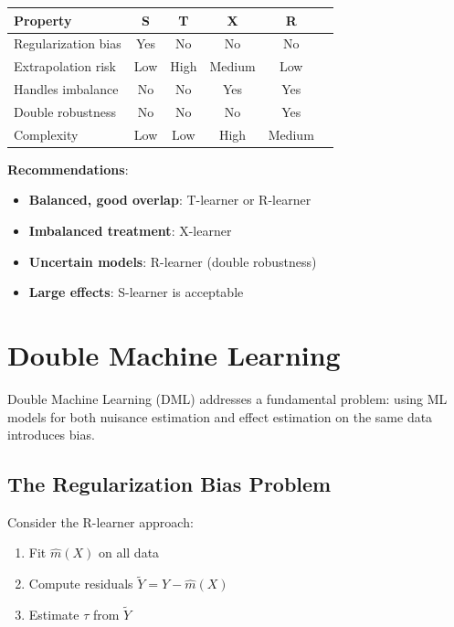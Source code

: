 \begin{center}
\begin{tabular}{lccccc}
\toprule
Property & S & T & X & R \\
\midrule
Regularization bias & Yes & No & No & No \\
Extrapolation risk & Low & High & Medium & Low \\
Handles imbalance & No & No & Yes & Yes \\
Double robustness & No & No & No & Yes \\
Complexity & Low & Low & High & Medium \\
\bottomrule
\end{tabular}
\end{center}

\textbf{Recommendations}:
\begin{itemize}
    \item \textbf{Balanced, good overlap}: T-learner or R-learner
    \item \textbf{Imbalanced treatment}: X-learner
    \item \textbf{Uncertain models}: R-learner (double robustness)
    \item \textbf{Large effects}: S-learner is acceptable
\end{itemize}

\section{Double Machine Learning}
\label{sec:dml}

Double Machine Learning (DML) addresses a fundamental problem: using ML models for both nuisance estimation and effect estimation on the same data introduces bias.

\subsection{The Regularization Bias Problem}

Consider the R-learner approach:
\begin{enumerate}
    \item Fit $\hat{m}(X)$ on all data
    \item Compute residuals $\tilde{Y} = Y - \hat{m}(X)$
    \item Estimate $\tau$ from $\tilde{Y}$
\end{enumerate}


